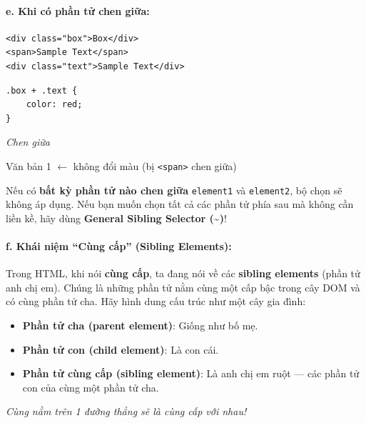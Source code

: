 \documentclass[11pt,oneside]{book}
\newcommand{\codeinline}[1]{\textcolor{accentOrange}{\texttt{#1}}}
\begin{document}
\paragraph{e. Khi có phần tử chen giữa:}
\begin{codeWindow}
\begin{lstlisting}[language=HTML5]
<div class="box">Box</div>
<span>Sample Text</span>
<div class="text">Sample Text</div>
\end{lstlisting}

\begin{lstlisting}[language=CSS3]
.box + .text {
    color: red;
}
\end{lstlisting}
\end{codeWindow}

\begin{browserWindow}
\sffamily\small
{} \par\vspace{4pt}
\textcolor{darkText}{\textit{Chen giữa}} \par\vspace{2pt}
\textcolor{darkText}{Văn bản 1} {\small\textcolor{gray!60}{$\leftarrow$ không đổi màu (bị \codeinline{<span>} chen giữa)}} \par\vspace{4pt}
\end{browserWindow}

\begin{warnBox}
Nếu có \textbf{bất kỳ phần tử nào chen giữa} \codeinline{element1} và \codeinline{element2}, bộ chọn sẽ không áp dụng. Nếu bạn muốn chọn tất cả các phần tử phía sau mà không cần liền kề, hãy dùng \textbf{General Sibling Selector (\textasciitilde{})}!
\end{warnBox}

\paragraph{f. Khái niệm ``Cùng cấp'' (Sibling Elements):}

\begin{conceptBox}
Trong HTML, khi nói \textbf{cùng cấp}, ta đang nói về các \textbf{sibling elements} (phần tử anh chị em). Chúng là những phần tử nằm cùng một cấp bậc trong cây DOM và có cùng phần tử cha. Hãy hình dung cấu trúc như một cây gia đình:
\begin{itemize}[leftmargin=1.5em, itemsep=2pt, parsep=0pt]
    \item \textbf{Phần tử cha (parent element)}: Giống như bố mẹ.
    \item \textbf{Phần tử con (child element)}: Là con cái.
    \item \textbf{Phần tử cùng cấp (sibling element)}: Là anh chị em ruột --- các phần tử con của cùng một phần tử cha.
\end{itemize}
\textit{Cùng nằm trên 1 đường thẳng sẽ là cùng cấp với nhau!}
\end{conceptBox}
\end{document}
